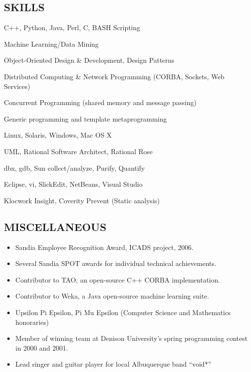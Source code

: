 \documentclass[10pt]{article}
\begin{document}
\subsection*{SKILLS}
\begin{itemize}
	\begin{item}
	C++, Python, Java, Perl, C, BASH Scripting
	\end{item}
	\begin{item}
	Machine Learning/Data Mining
	\end{item}
	\begin{item}
	Object-Oriented Design \& Development, Design Patterns
	\end{item}
	\begin{item}
	Distributed Computing \& Network Programming (CORBA, Sockets, Web Services)
	\end{item}
	\begin{item}
	Concurrent Programming (shared memory and message passing)
	\end{item}
	\begin{item}
	Generic programming and template metaprogramming
	\end{item}

	\begin{item}
	Linux, Solaris, Windows, Mac OS X
	\end{item}
	\begin{item}
	UML, Rational Software Architect, Rational Rose
	\end{item}
	\begin{item}
	dbx, gdb, Sun collect/analyze, Purify, Quantify
	\end{item}
	\begin{item}
	Eclipse, vi, SlickEdit, NetBeans, Visual Studio 
	\end{item}
	\begin{item}
	Klocwork Insight, Coverity Prevent (Static analysis)
	\end{item}
\end{itemize}
\noindent

\subsection*{MISCELLANEOUS}
\begin{itemize}
	\item{Sandia Employee Recognition Award, ICADS project, 2006.}
        \item{Several Sandia SPOT awards for individual technical achievements.}
	\item{Contributor to TAO, an open-source C++ CORBA implementation.}
	\item{Contributor to Weka, a Java open-source machine learning suite.}
	\item{Upsilon Pi Epsilon, Pi Mu Epsilon (Computer Science and Mathematics honoraries)}
	\item{Member of winning team at Denison University's spring programming contest in 2000 and 2001.}
	\item{Lead singer and guitar player for local Albuquerque band ``void*''}
\end{itemize}
\end{document}
